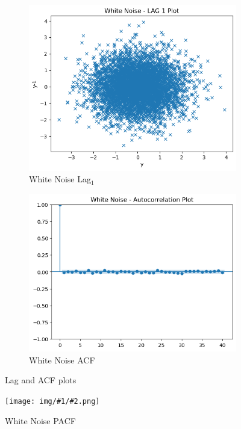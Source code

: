 \documentclass{article}
\newcommand{\fig}[3] {
\begin{figure}[H]
\centering
\texttt{[image: img/\#1/\#2.png]}
\caption{#3}
\label{figure:#1_#2}
\end{figure}
}
\begin{document}
\begin{figure}[htbp]
  \centering
  \begin{subfigure}[b]{0.45\textwidth}
    \includegraphics[width=\textwidth]{img/white_noise/lag_1.png}
    \caption{White Noise Lag$_1$}
    \label{fig:whitenoiselag}
  \end{subfigure}
  \hfill
  \begin{subfigure}[b]{0.45\textwidth}
    \includegraphics[width=\textwidth]{img/white_noise/acf.png}
    \caption{White Noise ACF}
    \label{fig:whitenoiseacf}
  \end{subfigure}
  \caption{Lag and ACF plots}
  \label{fig:whitenoise3}
\end{figure}
\fig{white_noise}{pacf}{White Noise PACF}
\end{document}
